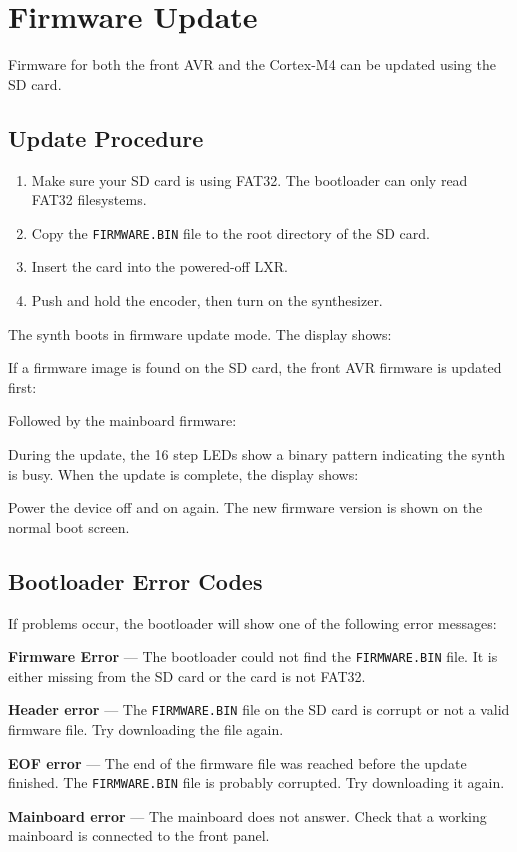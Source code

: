 \section{Firmware Update}\label{firmware-update}

Firmware for both the front AVR and the Cortex-M4 can be updated using
the SD card.

\subsection{Update Procedure}\label{update-procedure}

\begin{enumerate}
\def\labelenumi{\arabic{enumi}.}
\tightlist
\item
  Make sure your SD card is using FAT32. The bootloader can only read
  FAT32 filesystems.
\item
  Copy the \texttt{FIRMWARE.BIN} file to the root directory of the SD
  card.
\item
  Insert the card into the powered-off LXR.
\item
  Push and hold the encoder, then turn on the synthesizer.
\end{enumerate}

The synth boots in firmware update mode. The display shows:


If a firmware image is found on the SD card, the front AVR firmware is
updated first:


Followed by the mainboard firmware:


During the update, the 16 step LEDs show a binary pattern indicating the
synth is busy. When the update is complete, the display shows:


Power the device off and on again. The new firmware version is shown on
the normal boot screen.

\subsection{Bootloader Error Codes}\label{bootloader-error-codes}

If problems occur, the bootloader will show one of the following error
messages:

\textbf{Firmware Error} --- The bootloader could not find the
\texttt{FIRMWARE.BIN} file. It is either missing from the SD card or the
card is not FAT32.

\textbf{Header error} --- The \texttt{FIRMWARE.BIN} file on the SD card
is corrupt or not a valid firmware file. Try downloading the file again.

\textbf{EOF error} --- The end of the firmware file was reached before
the update finished. The \texttt{FIRMWARE.BIN} file is probably
corrupted. Try downloading it again.

\textbf{Mainboard error} --- The mainboard does not answer. Check that a
working mainboard is connected to the front panel.

